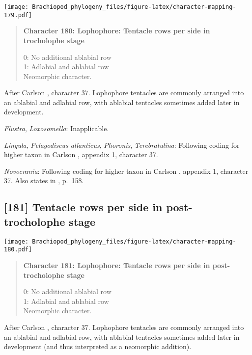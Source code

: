 \documentclass[openany]{book}
\theoremstyle{definition}
\theoremstyle{definition}
\theoremstyle{definition}
\theoremstyle{remark}
\begin{document}
\texttt{[image: Brachiopod\_phylogeny\_files/figure-latex/character-mapping-179.pdf]}

\begin{quote}
\textbf{Character 180: Lophophore: Tentacle rows per side in trocholophe
stage}

0: No additional ablabial row\\
1: Adlabial and ablabial row\\
Neomorphic character.
\end{quote}

After Carlson \citeyearpar{Carlson1995Phylogeneticrelationships},
character 37. Lophophore tentacles are commonly arranged into an
ablabial and adlabial row, with ablabial tentacles sometimes added later
in development.

\hypertarget{Flustra-coding-180}{}
\emph{Flustra}, \emph{Loxosomella}: Inapplicable.

\hypertarget{Lingula-coding-180}{}
\emph{Lingula}, \emph{Pelagodiscus atlanticus}, \emph{Phoronis},
\emph{Terebratulina}: Following coding for higher taxon in Carlson
\citeyearpar{Carlson1995Phylogeneticrelationships}, appendix 1,
character 37.

\hypertarget{Novocrania-coding-180}{}
\emph{Novocrania}: Following coding for higher taxon in Carlson
\citeyearpar{Carlson1995Phylogeneticrelationships}, appendix 1,
character 37. Also states in
\citet{Williams2000LinguliformeaCraniiformea}, p.~158.

\subsection*{{[}181{]} Tentacle rows per side in post-trocholophe
stage}\label{tentacle-rows-per-side-in-post-trocholophe-stage}

\texttt{[image: Brachiopod\_phylogeny\_files/figure-latex/character-mapping-180.pdf]}

\begin{quote}
\textbf{Character 181: Lophophore: Tentacle rows per side in
post-trocholophe stage}

0: No additional ablabial row\\
1: Adlabial and ablabial row\\
Neomorphic character.
\end{quote}

After Carlson \citeyearpar{Carlson1995Phylogeneticrelationships},
character 37. Lophophore tentacles are commonly arranged into an
ablabial and adlabial row, with ablabial tentacles sometimes added later
in development (and thus interpreted as a neomorphic addition).
\end{document}

